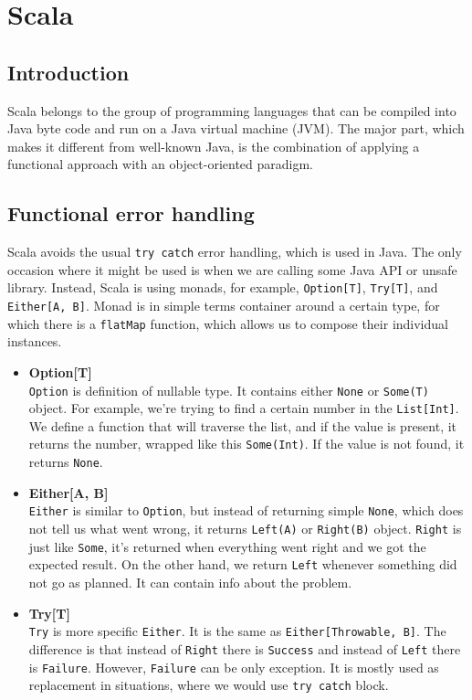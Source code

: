 \section{Scala}
\subsection{Introduction}
Scala belongs to the group of programming languages that can be compiled into Java byte code and run on a Java virtual machine (JVM). The major part, which makes it different from well-known Java, is the combination of applying a functional approach with an object-oriented paradigm. 

\subsection{Functional error handling}
Scala avoids the usual \texttt{try catch} error handling, which is used in Java. The only occasion where it might be used is when we are calling some Java API or unsafe library. Instead, Scala is using monads, for example, \texttt{Option[T]}, \texttt{Try[T]}, and \texttt{Either[A, B]}. Monad is in simple terms container around a certain type, for which there is a \texttt{flatMap} function, which allows us to compose their individual instances.
\begin{itemize}
    \item \textbf{Option[T]} \\
        \texttt{Option} is definition of nullable type. It contains either \texttt{None} or \texttt{Some(T)} object. For example, we're trying to find a certain number in the \texttt{List[Int]}. We define a function that will traverse the list, and if the value is present, it returns the number, wrapped like this \texttt{Some(Int)}. If the value is not found, it returns \texttt{None}.
    \item \textbf{Either[A, B]} \\
        \texttt{Either} is similar to \texttt{Option}, but instead of returning simple \texttt{None}, which does not tell us what went wrong, it returns \texttt{Left(A)} or \texttt{Right(B)} object. \texttt{Right} is just like \texttt{Some}, it's returned when everything went right and we got the expected result. On the other hand, we return \texttt{Left} whenever something did not go as planned. It can contain info about the problem.
    \item \textbf{Try[T]} \\
        \texttt{Try} is more specific \texttt{Either}. It is the same as \texttt{Either[Throwable, B]}. The difference is that instead of \texttt{Right} there is \texttt{Success} and instead of \texttt{Left} there is \texttt{Failure}. However, \texttt{Failure} can be only exception. It is mostly used as replacement in situations, where we would use \texttt{try catch} block.
\end{itemize}

